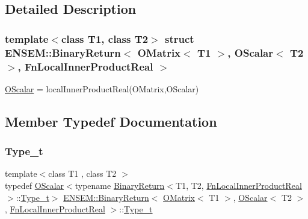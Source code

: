 \subsection{Detailed Description}
\subsubsection*{template$<$class T1, class T2$>$\newline
struct E\+N\+S\+E\+M\+::\+Binary\+Return$<$ O\+Matrix$<$ T1 $>$, O\+Scalar$<$ T2 $>$, Fn\+Local\+Inner\+Product\+Real $>$}

\mbox{\hyperlink{classENSEM_1_1OScalar}{O\+Scalar}} = local\+Inner\+Product\+Real(\+O\+Matrix,\+O\+Scalar) 

\subsection{Member Typedef Documentation}
\mbox{\label{structENSEM_1_1BinaryReturn_3_01OMatrix_3_01T1_01_4_00_01OScalar_3_01T2_01_4_00_01FnLocalInnerProductReal_01_4_a4dca9fd1aa942a0da9d64b937f1e7639}} 
\subsubsection{\texorpdfstring{Type\_t}{Type\_t}\hspace{0.1cm}{\footnotesize\ttfamily [1/3]}}
{\footnotesize\ttfamily template$<$class T1 , class T2 $>$ \\
typedef \mbox{\hyperlink{classENSEM_1_1OScalar}{O\+Scalar}}$<$typename \mbox{\hyperlink{structENSEM_1_1BinaryReturn}{Binary\+Return}}$<$T1, T2, \mbox{\hyperlink{structENSEM_1_1FnLocalInnerProductReal}{Fn\+Local\+Inner\+Product\+Real}}$>$\+::\mbox{\hyperlink{structENSEM_1_1BinaryReturn_3_01OMatrix_3_01T1_01_4_00_01OScalar_3_01T2_01_4_00_01FnLocalInnerProductReal_01_4_a4dca9fd1aa942a0da9d64b937f1e7639}{Type\+\_\+t}}$>$ \mbox{\hyperlink{structENSEM_1_1BinaryReturn}{E\+N\+S\+E\+M\+::\+Binary\+Return}}$<$ \mbox{\hyperlink{classENSEM_1_1OMatrix}{O\+Matrix}}$<$ T1 $>$, \mbox{\hyperlink{classENSEM_1_1OScalar}{O\+Scalar}}$<$ T2 $>$, \mbox{\hyperlink{structENSEM_1_1FnLocalInnerProductReal}{Fn\+Local\+Inner\+Product\+Real}} $>$\+::\mbox{\hyperlink{structENSEM_1_1BinaryReturn_3_01OMatrix_3_01T1_01_4_00_01OScalar_3_01T2_01_4_00_01FnLocalInnerProductReal_01_4_a4dca9fd1aa942a0da9d64b937f1e7639}{Type\+\_\+t}}}

